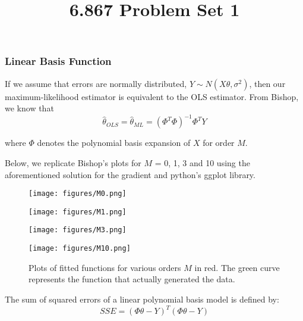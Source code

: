 \documentclass[10pt]{article}
\begin{document}
	\title{6.867 Problem Set 1}
	\maketitle

\subsubsection*{Linear Basis Function}

If we assume that errors are normally distributed,  $Y \sim N(X\theta, \sigma^2)$, then our maximum-likelihood estimator is equivalent to the OLS estimator. From Bishop, we know that
\begin{equation*}
	\hat{\theta}_{OLS}=\hat{\theta}_{ML}=(\Phi^T \Phi)^{-1}\Phi^T Y
\end{equation*}

where $\Phi$ denotes the polynomial basis expansion of $X$ for order $M$.

Below, we replicate Bishop's plots for $M$ = 0, 1, 3 and 10 using the aforementioned solution for the gradient and python's ggplot library.

\begin{figure}[ht]
	\centering
	\begin{minipage}[b]{.24\linewidth}
		\texttt{[image: figures/M0.png]}
		\caption*{$M=0$}
	\end{minipage}
	\begin{minipage}[b]{.24\linewidth}
		\texttt{[image: figures/M1.png]}
			\caption*{$M=1$}
	\end{minipage}
	\begin{minipage}[b]{.24\linewidth}
		\texttt{[image: figures/M3.png]}
		\caption*{$M=3$}
	\end{minipage}
	\begin{minipage}[b]{.24\linewidth}
		\texttt{[image: figures/M10.png]}
		\caption*{$M=10$}
	\end{minipage}
	\caption{Plots of fitted functions for various orders $M$ in red. The green curve represents the function that actually generated the data.} 
\end{figure}


The sum of squared errors of a linear polynomial basis model is defined by: 
\begin{equation*}
	SSE=(\Phi \theta-Y)^T(\Phi \theta-Y)
\end{equation*}
\end{document}
